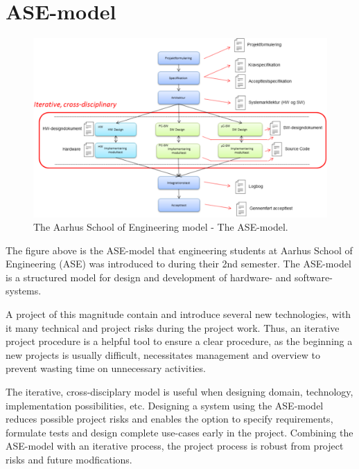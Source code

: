 \section{ASE-model}

\begin{figure}[H]
\centering
\includegraphics[scale=0.4]{./pictures/ASEmodel.png}
\caption{The Aarhus School of Engineering model - The ASE-model.}
\label{fig:ASEmodel.png}
\end{figure}

The figure above is the ASE-model that engineering students at Aarhus School of Engineering (ASE) was introduced to during their 2nd semester. The ASE-model is a structured model for design and development of hardware- and software-systems. \newline

A project of this magnitude contain and introduce several new technologies, with it many technical and project risks during the project work. Thus, an iterative project procedure is a helpful tool to ensure a clear procedure, as the beginning a new projects is usually difficult, necessitates management and overview to prevent wasting time on unnecessary activities. \newline

The iterative, cross-disciplary model is useful when designing domain, technology, implementation possibilities, etc. Designing a system using the ASE-model reduces possible project risks and enables the option to specify requirements, formulate tests and design complete use-cases early in the project. Combining the ASE-model with an iterative process, the project process is robust from project risks and future modfications. \newline

